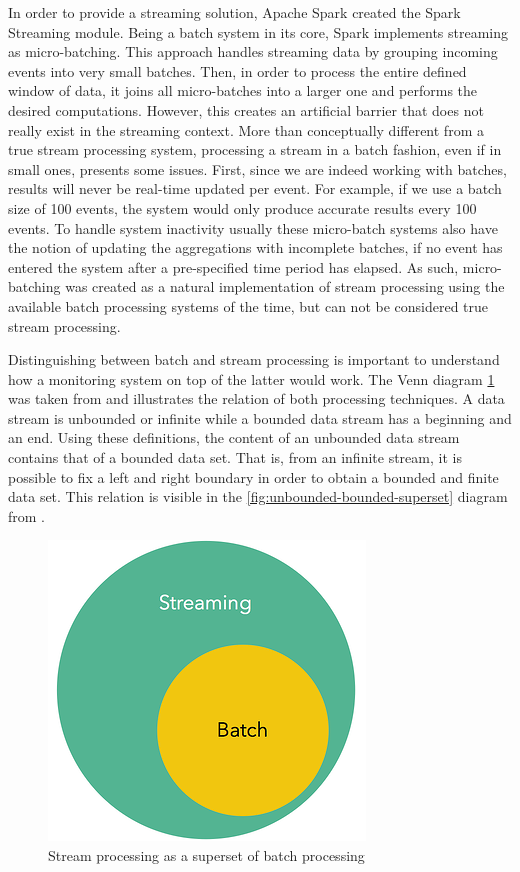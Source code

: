 In order to provide a streaming solution, Apache Spark created the Spark Streaming module. Being a batch system in its core, Spark implements streaming as micro-batching. This approach handles streaming data by grouping incoming events into very small batches. Then, in order to process the entire defined window of data, it joins all micro-batches into a larger one and performs the desired computations. However, this creates an artificial barrier that does not really exist in the streaming context. More than conceptually different from a true stream processing system, processing a stream in a batch fashion, even if in small ones, presents some issues. First, since we are indeed working with batches, results will never be real-time updated per event. For example, if we use a batch size of 100 events, the system would only produce accurate results every 100 events. To handle system inactivity usually these micro-batch systems also have the notion of updating the aggregations with incomplete batches, if no event has entered the system after a pre-specified time period has elapsed. As such, micro-batching was created as a natural implementation of stream processing using the available batch processing systems of the time, but can not be considered true stream processing.

Distinguishing between batch and stream processing is important to understand how a monitoring system on top of the latter would work. The Venn diagram \ref{fig:stream-superset} was taken from \cite{batch-is-a-special-case-of-streaming} and illustrates the relation of both processing techniques. A data stream is unbounded or infinite while a bounded data stream has a beginning and an end. Using these definitions, the content of an unbounded data stream contains that of a bounded data set. That is, from an infinite stream, it is possible to fix a left and right boundary in order to obtain a bounded and finite data set. This relation is visible in the \ref{fig:unbounded-bounded-superset} diagram from \cite{batch-is-a-special-case-of-streaming}.

\begin{figure}[!htb]
    \begin{center}
      \includegraphics[scale=0.7]{figures/streaming-subset-batch.png}
      \caption{Stream processing as a superset of batch processing}
      \label{fig:stream-superset}
    \end{center}
\end{figure}

